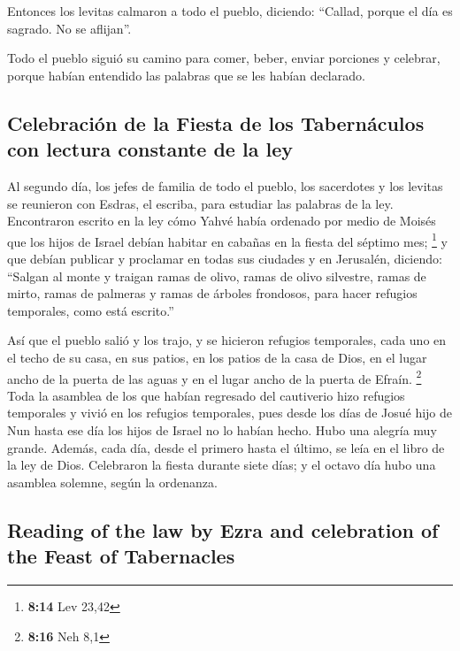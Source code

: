 \begin{paracol}{2}
 Entonces los levitas calmaron a todo el pueblo,
diciendo: ``Callad, porque el día es sagrado. No se aflijan''.

 Todo el pueblo siguió su camino para comer, beber,
enviar porciones y celebrar, porque habían entendido las palabras que se
les habían declarado.

\hypertarget{celebraciuxf3n-de-la-fiesta-de-los-tabernuxe1culos-con-lectura-constante-de-la-ley}{%
\subsection{Celebración de la Fiesta de los Tabernáculos con lectura
constante de la
ley}\label{celebraciuxf3n-de-la-fiesta-de-los-tabernuxe1culos-con-lectura-constante-de-la-ley}}

 Al segundo día, los jefes de familia de todo el pueblo,
los sacerdotes y los levitas se reunieron con Esdras, el escriba, para
estudiar las palabras de la ley.  Encontraron escrito en
la ley cómo Yahvé había ordenado por medio de Moisés que los hijos de
Israel debían habitar en cabañas en la fiesta del séptimo mes;
\footnote{\textbf{8:14} Lev 23,42}  y que debían publicar
y proclamar en todas sus ciudades y en Jerusalén, diciendo: ``Salgan al
monte y traigan ramas de olivo, ramas de olivo silvestre, ramas de
mirto, ramas de palmeras y ramas de árboles frondosos, para hacer
refugios temporales, como está escrito.''

 Así que el pueblo salió y los trajo, y se hicieron
refugios temporales, cada uno en el techo de su casa, en sus patios, en
los patios de la casa de Dios, en el lugar ancho de la puerta de las
aguas y en el lugar ancho de la puerta de Efraín. \footnote{\textbf{8:16}
  Neh 8,1}  Toda la asamblea de los que habían regresado
del cautiverio hizo refugios temporales y vivió en los refugios
temporales, pues desde los días de Josué hijo de Nun hasta ese día los
hijos de Israel no lo habían hecho. Hubo una alegría muy grande.
 Además, cada día, desde el primero hasta el último, se
leía en el libro de la ley de Dios. Celebraron la fiesta durante siete
días; y el octavo día hubo una asamblea solemne, según la ordenanza.

\switchcolumn
\begin{otherlanguage}{english}

\hypertarget{reading-of-the-law-by-ezra-and-celebration-of-the-feast-of-tabernacles}{%
\subsection{Reading of the law by Ezra and celebration of the Feast of
Tabernacles}\label{reading-of-the-law-by-ezra-and-celebration-of-the-feast-of-tabernacles}}


\end{otherlanguage}
\end{paracol}
